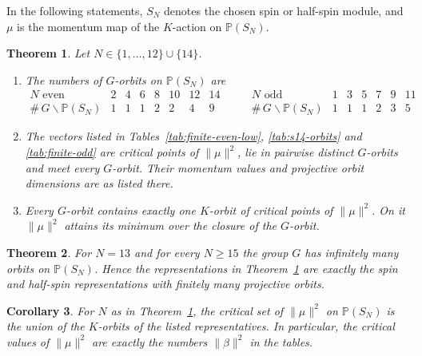 \documentclass{article}
\newtheorem{theorem}{Theorem}[section]
\newtheorem{corollary}[theorem]{Corollary}
\theoremstyle{definition}
\theoremstyle{remark}
\newcommand{\PP}{\mathbb P}
\newcommand{\norm}[1]{\lVert #1\rVert}
\begin{document}
In the following statements, $S_N$ denotes the chosen spin or
half-spin module, and $\mu$ is the momentum map of the $K$-action on
$\PP(S_N)$.

\begin{theorem}
\label{thm:finite-orbit-main}
Let $N\in\{1,\ldots,12\}\cup\{14\}$.
\begin{enumerate}
\item The numbers of $G$-orbits on $\PP(S_N)$ are
\begin{equation*}
\begin{array}{c|ccccccc}
N\text{ even}&2&4&6&8&10&12&14\\
\#\,G\backslash\PP(S_N)&1&1&1&2&2&4&9
\end{array}
\qquad
\begin{array}{c|cccccc}
N\text{ odd}&1&3&5&7&9&11\\
\#\,G\backslash\PP(S_N)&1&1&1&2&3&5
\end{array}
\end{equation*}
\item The vectors listed in Tables~\ref{tab:finite-even-low},
      \ref{tab:s14-orbits} and \ref{tab:finite-odd} are critical points of
      $\norm\mu^2$, lie in pairwise distinct $G$-orbits and meet every
      $G$-orbit. Their momentum values and projective orbit dimensions are as listed there.
\item Every $G$-orbit contains exactly one $K$-orbit of critical points of
      $\norm\mu^2$. On it $\norm\mu^2$ attains its minimum over the
      closure of the $G$-orbit.
\end{enumerate}
\end{theorem}

\begin{theorem}
\label{thm:finite-range}
For $N=13$ and for every $N\ge15$ the group $G$ has infinitely many orbits
on $\PP(S_N)$. Hence the representations in
Theorem~\ref{thm:finite-orbit-main} are exactly the spin and half-spin
representations with finitely many projective orbits.
\end{theorem}

\begin{corollary}
\label{cor:critical-values}
For $N$ as in Theorem~\ref{thm:finite-orbit-main}, the critical set of
$\norm\mu^2$ on $\PP(S_N)$ is the union of the $K$-orbits of the listed
representatives. In particular, the critical values of $\norm\mu^2$ are
exactly the numbers $\norm\beta^2$ in the tables.
\end{corollary}
\end{document}

